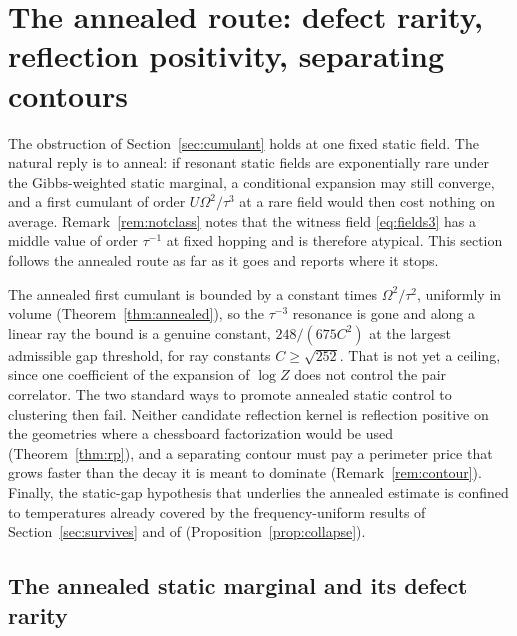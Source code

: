 \documentclass[11pt]{article}
\theoremstyle{definition}
\theoremstyle{remark}
\begin{document}
\section{The annealed route: defect rarity, reflection positivity, separating contours}
\label{sec:annealed}

The obstruction of Section~\ref{sec:cumulant} holds at one fixed static field. The
natural reply is to anneal: if resonant static fields are exponentially rare under
the Gibbs-weighted static marginal, a conditional expansion may still converge, and a
first cumulant of order $U\Omega^2/\tau^3$ at a rare field would then cost nothing on
average. Remark~\ref{rem:notclass} notes that the witness field \eqref{eq:fields3}
has a middle value of order $\tau^{-1}$ at fixed hopping and is therefore atypical.
This section follows the annealed route as far as it goes and reports where it stops.

The annealed first cumulant is bounded by a constant times $\Omega^2/\tau^2$,
uniformly in volume (Theorem~\ref{thm:annealed}), so the $\tau^{-3}$ resonance is
gone and along a linear ray the bound is a genuine constant, $248/(675C^2)$ at the
largest admissible gap threshold, for ray constants $C\ge\sqrt{252}$. That is not yet a ceiling, since one coefficient of
the expansion of $\log Z$ does not control the pair correlator. The two standard ways
to promote annealed static control to clustering then fail. Neither candidate
reflection kernel is reflection positive on the geometries where a chessboard
factorization would be used (Theorem~\ref{thm:rp}), and a separating contour must pay
a perimeter price that grows faster than the decay it is meant to dominate
(Remark~\ref{rem:contour}). Finally, the static-gap hypothesis that underlies the
annealed estimate is confined to temperatures already covered by the
frequency-uniform results of Section~\ref{sec:survives} and of \cite{stage6}
(Proposition~\ref{prop:collapse}).

\subsection{The annealed static marginal and its defect rarity}
\end{document}
